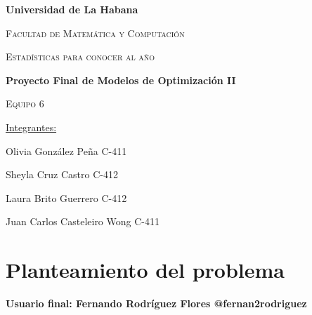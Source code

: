 \documentclass{book}
\begin{document}
	\begin{titlepage}
		\centering
		{\bfseries\LARGE Universidad de La Habana \par }
		\vspace{1cm}
		{\scshape\LARGE Facultad de Matem\'atica y Computaci\'on \par}
		\vspace{3cm}
		{\scshape\Huge Estad\'isticas para conocer al a\~no \par}
		\vspace{1cm}
		{\bfseries\LARGE Proyecto Final de Modelos de Optimizaci\'on II \par}
		{\scshape\Large Equipo 6 \par}
		\vspace{3cm}
		\vfill
		{\Large \underline{Integrantes:} \par}
		{\Large Olivia Gonz\'alez Pe\~na C-411 \par}
		{\Large Sheyla Cruz Castro C-412 \par}
		{\Large Laura Brito Guerrero C-412 \par}
		{\Large Juan Carlos Casteleiro Wong C-411 \par}
		\vfill
	\end{titlepage}
	
	
	\section{Planteamiento del problema}
		\textbf{Usuario final: Fernando Rodr\'iguez Flores @fernan2rodriguez}
\end{document}
